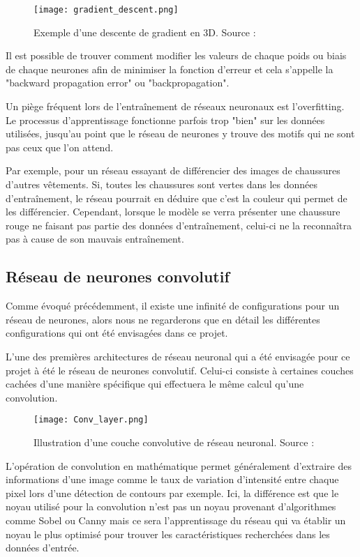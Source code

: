 \begin{figure}[tbph!]
	\centering
	\texttt{[image: gradient\_descent.png]}
	\caption[Exemple d'une descente de gradient en 3D]{Exemple d'une descente de gradient en 3D. Source : \cite{GradientDescentImage}}
\end{figure}

Il est possible de trouver comment modifier les valeurs de chaque poids ou biais
de chaque neurones afin de minimiser la fonction d'erreur et cela s'appelle la "backward propagation error" ou
"backpropagation".

Un piège fréquent lors de l'entraînement de réseaux neuronaux est l'overfitting. Le processus d'apprentissage fonctionne parfois trop "bien"
sur les données utilisées, jusqu'au point que le réseau de neurones y trouve des motifs qui ne sont pas ceux que l'on attend.

Par exemple, pour un réseau essayant de différencier des images de chaussures d'autres vêtements. 
Si, toutes les chaussures sont vertes dans les données d'entraînement, le réseau pourrait en déduire 
que c'est la couleur qui permet de les différencier. Cependant, lorsque le modèle se verra présenter
une chaussure rouge ne faisant pas partie des données d'entraînement, celui-ci ne la reconnaîtra pas 
à cause de son mauvais entraînement.

\subsection{Réseau de neurones convolutif}

Comme évoqué précédemment, il existe une infinité de configurations pour un réseau de neurones, alors nous ne regarderons que 
en détail les différentes configurations qui ont été envisagées dans ce projet.

L'une des premières architectures de réseau neuronal qui a été envisagée pour ce projet à été le réseau de neurones convolutif.
Celui-ci consiste à certaines couches cachées d'une manière spécifique qui effectuera le même calcul qu'une convolution.

\begin{figure}[tbph!]
	\centering
	\texttt{[image: Conv\_layer.png]}
	\caption[Illustration d'une couche convolutive de réseau neuronal]{Illustration d'une couche convolutive de réseau neuronal. Source : \cite{ConvImage}}
\end{figure}

L'opération de convolution en mathématique permet généralement d'extraire des informations d'une image comme le taux de 
variation d'intensité entre chaque pixel lors d'une détection de contours par exemple.
Ici, la différence est que le noyau utilisé pour la convolution n'est pas un noyau provenant d'algorithmes comme Sobel ou Canny mais ce sera
l'apprentissage du réseau qui va établir un noyau le plus optimisé pour trouver les caractéristiques recherchées dans les données d'entrée.

